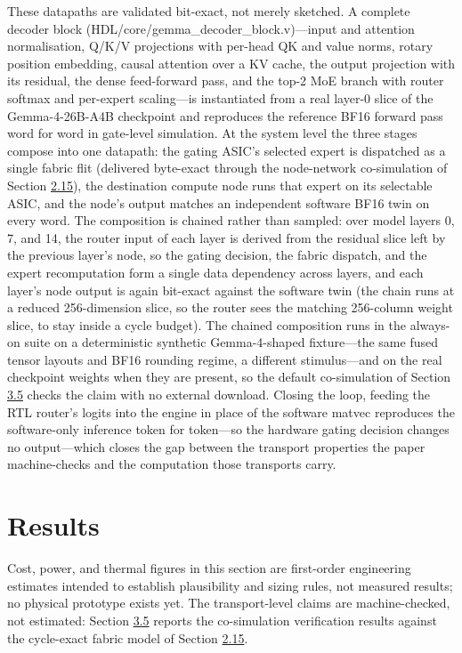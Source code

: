 \documentclass[10pt,twocolumn]{article}
\begin{document}
These datapaths are validated bit-exact, not merely sketched. A complete decoder block (HDL/core/gemma\_decoder\_block.v)---input and attention normalisation, Q/K/V projections with per-head QK and value norms, rotary position embedding, causal attention over a KV cache, the output projection with its residual, the dense feed-forward pass, and the top-2 MoE branch with router softmax and per-expert scaling---is instantiated from a real layer-0 slice of the Gemma-4-26B-A4B checkpoint and reproduces the reference BF16 forward pass word for word in gate-level simulation. At the system level the three stages compose into one datapath: the gating ASIC's selected expert is dispatched as a single fabric flit (delivered byte-exact through the node-network co-simulation of Section \hyperref[sec:2.15]{2.15}), the destination compute node runs that expert on its selectable ASIC, and the node's output matches an independent software BF16 twin on every word. The composition is chained rather than sampled: over model layers 0, 7, and 14, the router input of each layer is derived from the residual slice left by the previous layer's node, so the gating decision, the fabric dispatch, and the expert recomputation form a single data dependency across layers, and each layer's node output is again bit-exact against the software twin (the chain runs at a reduced 256-dimension slice, so the router sees the matching 256-column weight slice, to stay inside a cycle budget). The chained composition runs in the always-on suite on a deterministic synthetic Gemma-4-shaped fixture---the same fused tensor layouts and BF16 rounding regime, a different stimulus---and on the real checkpoint weights when they are present, so the default co-simulation of Section \hyperref[sec:3.5]{3.5} checks the claim with no external download. Closing the loop, feeding the RTL router's logits into the engine in place of the software matvec reproduces the software-only inference token for token---so the hardware gating decision changes no output---which closes the gap between the transport properties the paper machine-checks and the computation those transports carry.

\section*{Results}\label{sec:results}

Cost, power, and thermal figures in this section are first-order engineering estimates intended to establish plausibility and sizing rules, not measured results; no physical prototype exists yet. The transport-level claims are machine-checked, not estimated: Section \hyperref[sec:3.5]{3.5} reports the co-simulation verification results against the cycle-exact fabric model of Section \hyperref[sec:2.15]{2.15}.
\end{document}
